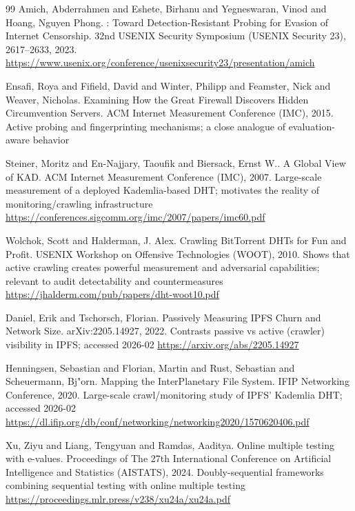 \documentclass[11pt]{article}
\begin{document}
\begin{thebibliography}{99}
Amich, Abderrahmen and Eshete, Birhanu and Yegneswaran, Vinod and Hoang, Nguyen Phong.
: Toward {Detection-Resistant} Probing for Evasion of Internet Censorship.
\newblock 32nd USENIX Security Symposium (USENIX Security 23), 2617--2633, 2023.
\newblock \url{https://www.usenix.org/conference/usenixsecurity23/presentation/amich}

Ensafi, Roya and Fifield, David and Winter, Philipp and Feamster, Nick and Weaver, Nicholas.
\newblock Examining How the Great Firewall Discovers Hidden Circumvention Servers.
\newblock ACM Internet Measurement Conference (IMC), 2015.
\newblock Active probing and fingerprinting mechanisms; a close analogue of evaluation-aware behavior

Steiner, Moritz and En-Najjary, Taoufik and Biersack, Ernst W..
\newblock A Global View of {KAD}.
\newblock ACM Internet Measurement Conference (IMC), 2007.
\newblock Large-scale measurement of a deployed Kademlia-based DHT; motivates the reality of monitoring/crawling infrastructure
\newblock \url{https://conferences.sigcomm.org/imc/2007/papers/imc60.pdf}

Wolchok, Scott and Halderman, J. Alex.
\newblock Crawling {BitTorrent} {DHT}s for Fun and Profit.
\newblock USENIX Workshop on Offensive Technologies (WOOT), 2010.
\newblock Shows that active crawling creates powerful measurement and adversarial capabilities; relevant to audit detectability and countermeasures
\newblock \url{https://jhalderm.com/pub/papers/dht-woot10.pdf}

Daniel, Erik and Tschorsch, Florian.
\newblock Passively Measuring IPFS Churn and Network Size.
\newblock arXiv:2205.14927, 2022.
\newblock Contrasts passive vs active (crawler) visibility in IPFS; accessed 2026-02
\newblock \url{https://arxiv.org/abs/2205.14927}

Henningsen, Sebastian and Florian, Martin and Rust, Sebastian and Scheuermann, Bj{"o}rn.
\newblock Mapping the InterPlanetary File System.
\newblock IFIP Networking Conference, 2020.
\newblock Large-scale crawl/monitoring study of IPFS' Kademlia DHT; accessed 2026-02
\newblock \url{https://dl.ifip.org/db/conf/networking/networking2020/1570620406.pdf}

Xu, Ziyu and Liang, Tengyuan and Ramdas, Aaditya.
\newblock Online multiple testing with e-values.
\newblock Proceedings of The 27th International Conference on Artificial Intelligence and Statistics (AISTATS), 2024.
\newblock Doubly-sequential frameworks combining sequential testing with online multiple testing
\newblock \url{https://proceedings.mlr.press/v238/xu24a/xu24a.pdf}


\end{thebibliography}
\end{document}
